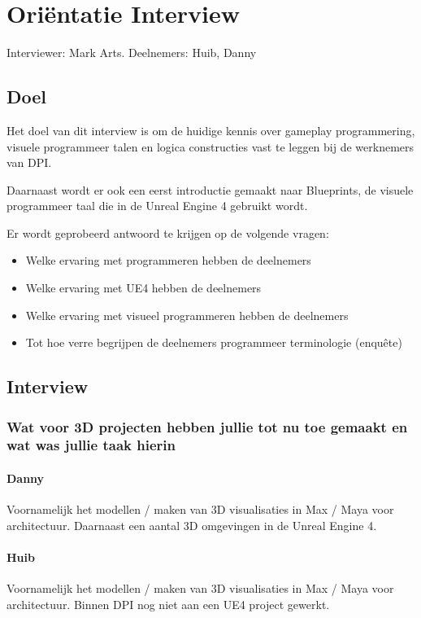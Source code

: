 
\chapter{Oriëntatie Interview}
\label{appendix:oreintatieintervieuw}
\lhead{}
Interviewer: Mark Arts. Deelnemers: Huib, Danny

\section{Doel}
Het doel van dit interview is om de huidige kennis over gameplay programmering, visuele programmeer talen en logica constructies vast te leggen bij de werknemers van DPI.

Daarnaast wordt er ook een eerst introductie gemaakt naar Blueprints, de visuele programmeer taal die in de Unreal Engine 4 gebruikt wordt.

Er wordt geprobeerd antwoord te krijgen op de volgende vragen:

\begin{itemize}
	\item Welke ervaring met programmeren hebben de deelnemers
	\item Welke ervaring met UE4 hebben de deelnemers
	\item Welke ervaring met visueel programmeren hebben de deelnemers
	\item Tot hoe verre begrijpen de deelnemers programmeer terminologie (enquête)
\end{itemize}

\section{Interview}
\label{appendix:oreintatieintervieuw:interview}
\subsection*{Wat voor 3D projecten hebben jullie tot nu toe gemaakt en wat was jullie taak hierin}
\subsubsection*{Danny}
Voornamelijk het modellen / maken van 3D visualisaties in Max / Maya voor architectuur. Daarnaast een aantal 3D omgevingen in de Unreal Engine 4.
\subsubsection*{Huib}
Voornamelijk het modellen / maken van 3D visualisaties in Max / Maya voor architectuur. Binnen DPI nog niet aan een UE4 project gewerkt. 

